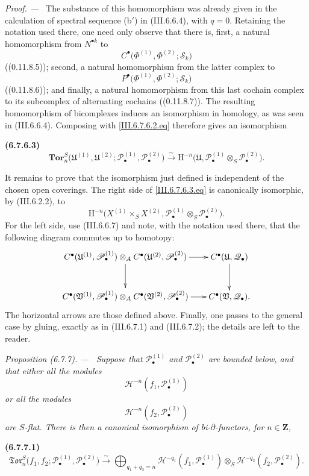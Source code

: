 \documentclass[10pt,oneside]{book}
\newcommand{\sh}[1]{\mathscr{#1}}
\newcommand{\HH}{\mathrm H}
\newcommand{\sref}[2][]{(#2)}
\newenvironment{env}[1][]{\par\medskip\noindent\textbf{(#1)}\ }{\par}
\newenvironment{proposition}[1][]{\par\medskip\noindent\itshape Proposition (#1). ---\ }{\par}
\newenvironment{proof}{\par\medskip\noindent\textit{Proof. ---\ }}{\par}
\begin{document}
\begin{proof}
The substance of this homomorphism was already given in the
calculation of spectral sequence \textnormal{(b$'$)} in
\sref{III.6.6.4}, with $q=0$.  Retaining the notation used
there, one need only observe that there is, first, a natural
homomorphism from $N^{\bullet k}$ to
\[
  C^\bullet
  \bigl(
    \Phi^{(1)},\Phi^{(2)};\mathcal S_k
  \bigr)
\]
(\sref[0]{0.11.8.5}); second, a natural homomorphism from the
latter complex to
\[
  P^\bullet
  \bigl(
    \Phi^{(1)},\Phi^{(2)};\mathcal S_k
  \bigr)
\]
(\sref[0]{0.11.8.6}); and finally, a natural homomorphism from
this last cochain complex to its subcomplex of alternating
cochains (\sref[0]{0.11.8.7}).  The resulting homomorphism of
bicomplexes induces an isomorphism in homology, as was seen in
\sref{III.6.6.4}.  Composing with
\eqref{III.6.7.6.2.eq} therefore gives an isomorphism
\begin{env}[6.7.6.3]
\label{III.6.7.6.3}
\[
  \mathbf{Tor}_n^S
  \bigl(
    \mathfrak U^{(1)},\mathfrak U^{(2)};
    \sh P_\bullet^{(1)},\sh P_\bullet^{(2)}
  \bigr)
  \xrightarrow{\sim}
  \HH^{-n}
  \bigl(
    \mathfrak U,
    \sh P_\bullet^{(1)}
    \otimes_S\sh P_\bullet^{(2)}
  \bigr).
  \tag{6.7.6.3}\label{III.6.7.6.3.eq}
\]
\end{env}

It remains to prove that the isomorphism just defined is
independent of the chosen open coverings.  The right side of
\eqref{III.6.7.6.3.eq} is canonically isomorphic, by
\sref{III.6.2.2}, to
\[
  \HH^{-n}
  \bigl(
    X^{(1)}\times_SX^{(2)},
    \sh P_\bullet^{(1)}
    \otimes_S\sh P_\bullet^{(2)}
  \bigr).
\]
For the left side, use \sref{III.6.6.7} and note, with the
notation used there, that the following diagram commutes up to
homotopy:
\[
\xymatrix@C=18pt@R=28pt{
  C^\bullet(\mathfrak U^{(1)},\sh P_\bullet^{(1)})
  \otimes_A
  C^\bullet(\mathfrak U^{(2)},\sh P_\bullet^{(2)})
  \ar[r]\ar[d]
  &
  C^\bullet(\mathfrak U,\sh Q_\bullet)
  \ar[d]
  \\
  C^\bullet(\mathfrak V^{(1)},\sh P_\bullet^{(1)})
  \otimes_A
  C^\bullet(\mathfrak V^{(2)},\sh P_\bullet^{(2)})
  \ar[r]
  &
  C^\bullet(\mathfrak V,\sh Q_\bullet).
}
\]
The horizontal arrows are those defined above.  Finally, one
passes to the general case by gluing, exactly as in
\sref{III.6.7.1} and \sref{III.6.7.2}; the details are left to
the reader.
\end{proof}

\begin{proposition}[6.7.7]
\label{III.6.7.7}
Suppose that $\sh P_\bullet^{(1)}$ and
$\sh P_\bullet^{(2)}$ are bounded below, and that either all the
modules
\[
  \sh H^{-n}(f_1,\sh P_\bullet^{(1)})
\]
or all the modules
\[
  \sh H^{-n}(f_2,\sh P_\bullet^{(2)})
\]
are $S$-flat.  There is then a canonical isomorphism of
bi-$\partial$-functors, for $n\in\mathbf Z$,
\begin{env}[6.7.7.1]
\label{III.6.7.7.1}
\[
  \mathfrak{Tor}_n^S
  \bigl(
    f_1,f_2;
    \sh P_\bullet^{(1)},\sh P_\bullet^{(2)}
  \bigr)
  \xrightarrow{\sim}
  \bigoplus_{q_1+q_2=n}
  \sh H^{-q_1}(f_1,\sh P_\bullet^{(1)})
  \otimes_S
  \sh H^{-q_2}(f_2,\sh P_\bullet^{(2)}).
  \tag{6.7.7.1}\label{III.6.7.7.1.eq}
\]
\end{env}
\end{proposition}
\end{document}

